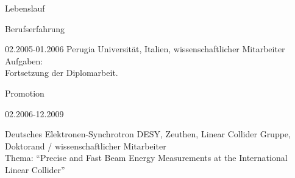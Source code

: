 \documentclass[11pt,a4paper]{scrartcl}
\begin{document}
\begin{cv}{Lebenslauf}
\begin{cvlist}{Berufserfahrung}
\vspace{\baselineskip}

\item[02.2005-01.2006] Perugia
Universit\"at, Italien, wissenschaftlicher Mitarbeiter \\

Aufgaben:\\

Fortsetzung der Diplomarbeit.

\end{cvlist}

\begin{cvlist}{Promotion}
\item[02.2006-12.2009]

Deutsches Elektronen-Synchrotron DESY, Zeuthen, Linear Collider
Gruppe, Doktorand / wissenschaftlicher Mitarbeiter\\ Thema:
"`Precise and Fast Beam Energy Measurements at the International
Linear Collider"'

% 
%   
%   
%   


\end{cvlist}
\end{cv}
\end{document}

